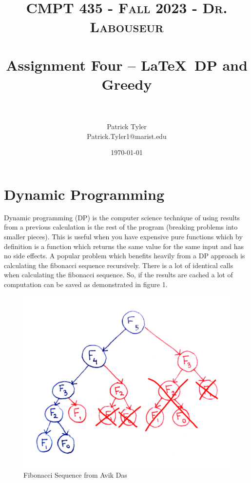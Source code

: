 \documentclass[letterpaper, 10pt]{article}
\title{	
   \normalfont \normalsize 
   \textsc{CMPT 435 - Fall 2023 - Dr. Labouseur} \\[10pt] %
   \horrule{0.5pt} \\[0.25cm] 	%
   \huge Assignment Four -- \LaTeX ~DP and Greedy\\     	    %
   \horrule{0.5pt} \\[0.25cm] 	%
}
\author{Patrick Tyler \\ \normalsize Patrick.Tyler1@marist.edu}
\date{\normalsize\today} 	%
\begin{document}
\maketitle %
\section{Dynamic Programming}
Dynamic programming (DP) is the computer science technique of using results from a previous calculation
is the rest of the program (breaking problems into smaller pieces). This is useful when you have expensive pure functions 
which by definition is a function which returns the same value for the same input and has no side effects.
A popular problem which benefits heavily from a DP approach is calculating
the fibonacci sequence recursively. There is a lot of identical calls when calculating the fibonacci sequence.
So, if the results are cached a lot of computation can be saved as demonstrated in figure 1.
\begin{figure}[h]
    \centering
    \includegraphics[width=.5\textwidth]{fibonacci-memoized.png}
    \caption{Fibonacci Sequence from Avik Das}
    \label{fig:your_label}
\end{figure}
\newpage
\end{document}
